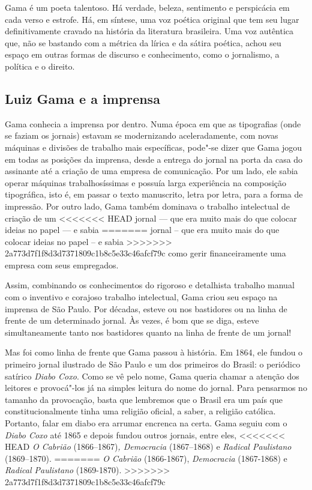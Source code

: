 Gama é um poeta talentoso. Há verdade, beleza, sentimento e perspicácia
em cada verso e estrofe. Há, em síntese, uma voz poética original que
tem seu lugar definitivamente cravado na história da literatura
brasileira. Uma voz autêntica que, não se bastando com a métrica da
lírica e da sátira poética, achou seu espaço em outras formas de
discurso e conhecimento, como o jornalismo, a política e o direito.

\subsection{Luiz Gama e a imprensa}

Gama conhecia a imprensa por dentro. Numa época em que as tipografias
(onde se faziam os jornais) estavam se modernizando aceleradamente, com
novas máquinas e divisões de trabalho mais específicas, pode"-se dizer
que Gama jogou em todas as posições da imprensa, desde a entrega do
jornal na porta da casa do assinante até a criação de uma empresa de
comunicação. Por um lado, ele sabia operar máquinas trabalhosíssimas e
possuía larga experiência na composição tipográfica, isto é, em passar o
texto manuscrito, letra por letra, para a forma de impressão. Por outro
lado, Gama também dominava o trabalho intelectual de criação de um
<<<<<<< HEAD
jornal --- que era muito mais do que colocar ideias no papel --- e sabia
=======
jornal – que era muito mais do que colocar ideias no papel – e sabia
>>>>>>> 2a773d7f1f8d3d7371809c1b8c5e33c46afcf79c
como gerir financeiramente uma empresa com seus empregados.

Assim, combinando os conhecimentos do rigoroso e detalhista trabalho
manual com o inventivo e corajoso trabalho intelectual, Gama criou seu
espaço na imprensa de São Paulo. Por décadas, esteve ou nos bastidores
ou na linha de frente de um determinado jornal. Às vezes, é bom que se
diga, esteve simultaneamente tanto nos bastidores quanto na linha de
frente de um jornal!

Mas foi como linha de frente que Gama passou à história. Em 1864, ele
fundou o primeiro jornal ilustrado de São Paulo e um dos primeiros do
Brasil: o periódico satírico \emph{Diabo Coxo}. Como se vê pelo nome,
Gama queria chamar a atenção dos leitores e provocá"-los já na simples
leitura do nome do jornal. Para pensarmos no tamanho da provocação,
basta que lembremos que o Brasil era um país que constitucionalmente
tinha uma religião oficial, a saber, a religião católica. Portanto,
falar em diabo era arrumar encrenca na certa. Gama seguiu com o
\emph{Diabo Coxo} até 1865 e depois fundou outros jornais, entre eles,
<<<<<<< HEAD
\emph{O Cabrião} (1866--1867)\emph{, Democracia} (1867--1868) e
\emph{Radical Paulistano} (1869--1870).
=======
\emph{O Cabrião} (1866-1867), \emph{Democracia} (1867-1868) e
\emph{Radical Paulistano} (1869-1870).
>>>>>>> 2a773d7f1f8d3d7371809c1b8c5e33c46afcf79c

